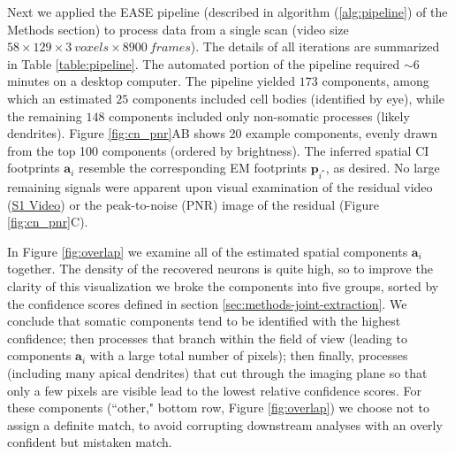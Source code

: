 \documentclass[10pt,letterpaper]{article}
\def \videoOneURL{https://www.dropbox.com/s/0ph27nsx5fxcc1b/demixing_scan_1_201_9100.avi?dl=0}
\begin{document}
Next we applied the EASE pipeline (described in algorithm (\ref{alg:pipeline}) of the Methods section) to process data from a single scan (video size $58\times 129\times 3~ voxels \times 8900 ~frames$). The details of all iterations are summarized in Table \ref{table:pipeline}.  The automated portion of the pipeline required $\sim 6$ minutes on a desktop computer.
The pipeline yielded $173$ components, among which an estimated $25$ components included cell bodies (identified by eye), while the remaining $148$ components included only  non-somatic processes (likely dendrites). 
Figure \ref{fig:cn_pnr}AB shows 20 example components, evenly drawn from the top 100 components (ordered by brightness). The inferred spatial CI footprints $\bm{a}_i$ resemble the corresponding EM footprints $\bm{p}_{i^*}$, as desired.  No large remaining signals were apparent upon visual examination of the residual video (\href{\videoOneURL}{S1 Video}) or the peak-to-noise (PNR) image of the residual (Figure \ref{fig:cn_pnr}C).  

In Figure \ref{fig:overlap} we examine all of the estimated spatial components $\bm{a}_i$ together.  The density of the recovered neurons is quite high, so to improve the clarity of this visualization we broke the components into five groups, sorted by the confidence scores defined in section \ref{sec:methods-joint-extraction}.  We conclude that somatic components tend to be identified with the highest confidence; then processes that branch within the field of view (leading to components $\bm{a}_i$ with a large total number of pixels); then finally, processes (including many apical dendrites) that cut through the imaging plane so that only a few pixels are visible lead to the lowest relative confidence scores.  For these components (``other," bottom row, Figure \ref{fig:overlap}) we choose not to assign a definite match, to avoid corrupting downstream analyses with an overly confident but mistaken match.
\end{document}
